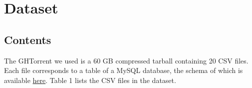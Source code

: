 \section{Dataset}

\subsection{Contents}

The GHTorrent  we used is a 60 GB compressed tarball containing 20 CSV files. Each file corresponds to a table of a MySQL database, the schema of which is available \href{http://ghtorrent.org/files/schema.pdf}{here}.
Table 1 lists the CSV files in the dataset.


